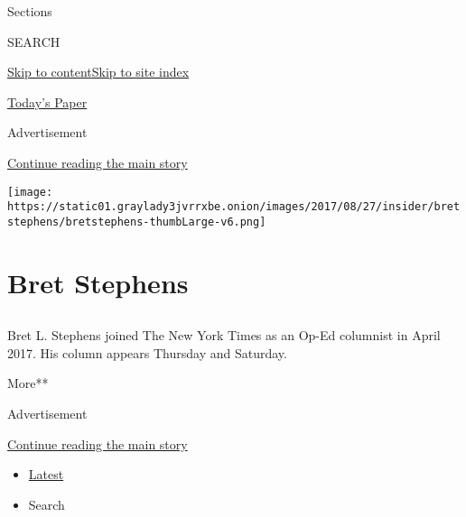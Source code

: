 Sections

SEARCH

\protect\hyperlink{site-content}{Skip to
content}\protect\hyperlink{site-index}{Skip to site index}

\href{https://myaccount.nytimes3xbfgragh.onion/auth/login?response_type=cookie\&client_id=vi}{}

\href{https://www.nytimes3xbfgragh.onion/section/todayspaper}{Today's
Paper}

Advertisement

\protect\hyperlink{after-top}{Continue reading the main story}

\texttt{[image: https://static01.graylady3jvrrxbe.onion/images/2017/08/27/insider/bretstephens/bretstephens-thumbLarge-v6.png]}

\hypertarget{bret-stephens}{%
\section{Bret Stephens}\label{bret-stephens}}

\subsection{}

Bret L. Stephens joined The New York Times as an Op-Ed columnist in
April 2017. His column appears Thursday and Saturday.

More**

Advertisement

\protect\hyperlink{after-mid1}{Continue reading the main story}

\begin{itemize}
\tightlist
\item
  \protect\hyperlink{stream-panel}{Latest}
\item
  Search
\end{itemize}

